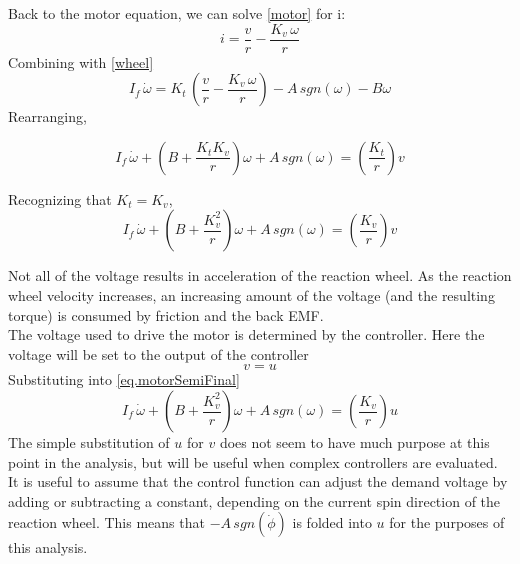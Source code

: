 \documentclass[12pt,letterpaper]{article}
\begin{document}
Back to the motor equation, we can solve \eqref{motor} for i:
%
\begin{equation}
    i = \frac{v}{r} - \frac{K_{v} \, \omega}{r}
\end{equation}
%
Combining with \eqref{wheel}
%
\begin{equation}
    I_{f} \, \dot{\omega}  =  K_{t} \, \left( \frac{v}{r} - \frac{ K_{v} \, \omega}{r} \right) - A \, sgn(\omega ) - B \omega
\end{equation}
Rearranging,

\begin{equation}
    I_{f} \, \dot{\omega} + \left( B+\frac{K_{t} K_{v}}{r} \right) \omega +A \, sgn(\omega)= \left(\frac{K_{t}} {r}\right)v 
\end{equation}

Recognizing that $K_{t} = K_{v}$,
\begin{equation}
    I_{f} \, \dot{\omega} + \left( B+\frac{K_{v}^2}{r} \right) \omega +A \, sgn(\omega)= \left(\frac{K_{v}} {r}\right)v\label{eq.motorSemiFinal} 
\end{equation}

Not all of the voltage results in acceleration of the reaction wheel.  As the reaction wheel velocity increases, an
increasing amount of the voltage (and the resulting torque) is consumed by friction and the back EMF.\\

The voltage used to drive the motor is determined by the controller.  Here the voltage will be set to the output of the controller
\begin{equation}
    v = u 
\end{equation}
Substituting into \eqref{eq.motorSemiFinal}
\begin{equation}
    I_{f} \, \dot{\omega} + \left( B+\frac{K_{v}^2}{r} \right) \omega +A \, sgn(\omega)= \left(\frac{K_{v}} {r}\right)u\label{eq.motorFinal} 
\end{equation}
The simple substitution of $u$ for $v$ does not seem to have much purpose at this point in the analysis, but will be useful
when complex controllers are evaluated.\\

It is useful to assume that the control function can adjust the demand voltage by adding or subtracting a constant, depending on the current spin direction of the reaction wheel.  This means that $-A\,sgn(\dot{\phi})$ is folded
into $u$ for the purposes of this analysis.  
\end{document}

